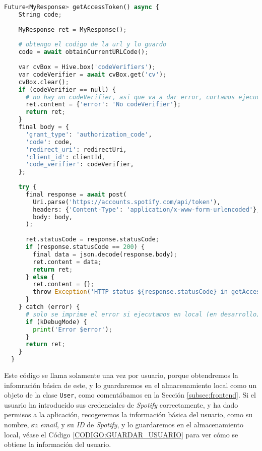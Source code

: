 \begin{lstlisting}[language=python, caption=Obtener \texttt{access\_token} y \texttt{refresh\_token}, label=CODIGO:GET_ACCESS_TOKEN]
  Future<MyResponse> getAccessToken() async {
    String code;
  
    MyResponse ret = MyResponse();
  
    # obtengo el codigo de la url y lo guardo
    code = await obtainCurrentURLCode();
  
    var cvBox = Hive.box('codeVerifiers');
    var codeVerifier = await cvBox.get('cv');
    cvBox.clear();
    if (codeVerifier == null) {
      # no hay un codeVerifier, asi que va a dar error, cortamos ejecucion
      ret.content = {'error': 'No codeVerifier'};
      return ret;
    }
    final body = {
      'grant_type': 'authorization_code',
      'code': code,
      'redirect_uri': redirectUri,
      'client_id': clientId,
      'code_verifier': codeVerifier,
    };
  
    try {
      final response = await post(
        Uri.parse('https://accounts.spotify.com/api/token'),
        headers: {'Content-Type': 'application/x-www-form-urlencoded'},
        body: body,
      );
  
      ret.statusCode = response.statusCode;
      if (response.statusCode == 200) {
        final data = json.decode(response.body);
        ret.content = data;
        return ret;
      } else {
        ret.content = {};
        throw Exception('HTTP status ${response.statusCode} in getAccessToken');
      }
    } catch (error) {
      # solo se imprime el error si ejecutamos en local (en desarrollo)
      if (kDebugMode) {
        print('Error $error');
      }
      return ret;
    }
  }

\end{lstlisting}

Este código se llama solamente una vez por usuario, porque obtendremos la infomración básica de este, y lo guardaremos
en el almacenamiento local como un objeto de la clase \texttt{User}, como comentábamos en la Sección \ref{subsec:frontend}.
Si el usuario ha introducido sus credenciales de \textit{Spotify} correctamente, y ha dado permisos a la aplicación, recogeremos
la información básica del usuario, como su nombre, su \textit{email}, y su \textit{ID} de \textit{Spotify}, y lo guardaremos en 
el almacenamiento local, véase el Código \ref{CODIGO:GUARDAR_USUARIO} para ver cómo se obtiene la información del usuario.

